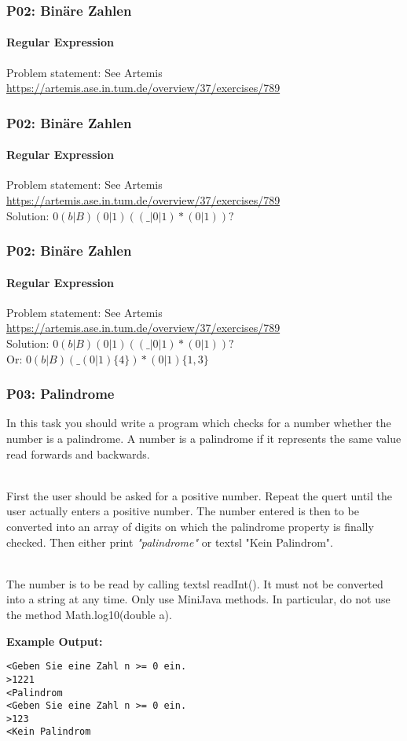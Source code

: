 \documentclass[handout, navsym]{tum-presentation}
\numberwithin{equation}{section}
\begin{document}
\begin{frame}[fragile]
\frametitle{P02: Binäre Zahlen}
\framesubtitle{Regular Expression}
\vspace*{\fill} \large
Problem statement: See Artemis \url{https://artemis.ase.in.tum.de/overview/37/exercises/789}\\
\vspace*{\fill}
\end{frame}

\begin{frame}[fragile]
\frametitle{P02: Binäre Zahlen}
\framesubtitle{Regular Expression}
\vspace*{\fill} \large
Problem statement: See Artemis \url{https://artemis.ase.in.tum.de/overview/37/exercises/789}\\
\bigskip
Solution: $0(b|B)(0|1)((\_|0|1)*(0|1))?$\\
\vspace*{\fill}
\end{frame}

\begin{frame}[fragile]
\frametitle{P02: Binäre Zahlen}
\framesubtitle{Regular Expression}
\vspace*{\fill} \large
Problem statement: See Artemis \url{https://artemis.ase.in.tum.de/overview/37/exercises/789}\\
\bigskip
Solution: $0(b|B)(0|1)((\_|0|1)*(0|1))?$\\
\bigskip
Or: $0(b|B)(\_(0|1)\{4\})*(0|1)\{1,3\}$
\vspace*{\fill}
\end{frame}

\begin{frame}[fragile]
\frametitle{P03: Palindrome}
\vspace*{\fill} \big

In this task you should write a program which checks for a number whether the number is a palindrome. A number is a palindrome if it represents the same value read forwards and backwards.\par
~\\
First the user should be asked for a positive number. Repeat the quert until the user actually enters a positive number. The number entered is then to be converted into an array of digits on which the palindrome property is finally checked. Then either print \textsl{ \color{blue}"palindrome"} or textsl{ \color{blue}"Kein Palindrom"}.\par
~\\
The number is to be read by calling  textsl{ \color{red}readInt()}. It must not be converted into a string at any time. Only use MiniJava methods. In particular, do not use the method Math.log10(double a).\par
\bigskip
\textbf{\large Example Output:}
\center
\begin{lstlisting}
<Geben Sie eine Zahl n >= 0 ein.
>1221
<Palindrom
<Geben Sie eine Zahl n >= 0 ein.
>123
<Kein Palindrom
\end{lstlisting}
\vspace*{\fill}
\end{frame}
\end{document}
